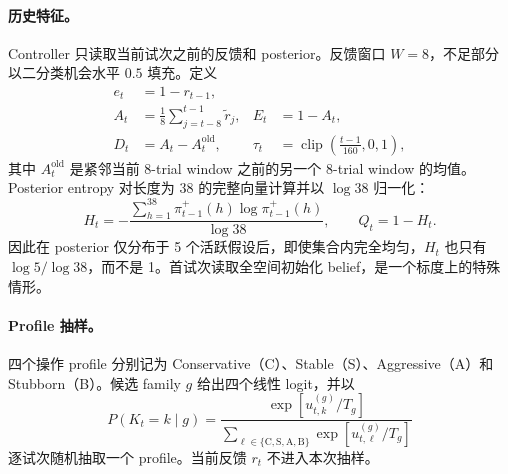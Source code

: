 \paragraph{历史特征。}
Controller 只读取当前试次之前的反馈和 posterior。反馈窗口 $W=8$，不足部分以二分类机会水平 $0.5$ 填充。定义
\begin{align}
    e_t&=1-r_{t-1},\\
    A_t&=\frac{1}{8}\sum_{j=t-8}^{t-1}\widetilde r_j,
    &E_t&=1-A_t,\\
    D_t&=A_t-A_t^{\mathrm{old}},
    &\tau_t&=\operatorname{clip}\!\left(\frac{t-1}{160},0,1\right),
    \label{eq:modelv13-controller-history}
\end{align}
其中 $A_t^{\mathrm{old}}$ 是紧邻当前 8-trial window 之前的另一个 8-trial window 的均值。Posterior entropy 对长度为 38 的完整向量计算并以 $\log38$ 归一化：
\begin{equation}
    H_t=-\frac{\sum_{h=1}^{38}\pi_{t-1}^{+}(h)
    \log\pi_{t-1}^{+}(h)}{\log38},
    \qquad Q_t=1-H_t.
    \label{eq:modelv13-controller-entropy}
\end{equation}
因此在 posterior 仅分布于 5 个活跃假设后，即使集合内完全均匀，$H_t$ 也只有 $\log5/\log38$，而不是 1。首试次读取全空间初始化 belief，是一个标度上的特殊情形。

\paragraph{Profile 抽样。}
四个操作 profile 分别记为 Conservative（C）、Stable（S）、Aggressive（A）和 Stubborn（B）。候选 family $g$ 给出四个线性 logit，并以
\begin{equation}
    P(K_t=k\mid g)=
    \frac{\exp[u_{t,k}^{(g)}/T_g]}
    {\sum_{\ell\in\{\mathrm C,\mathrm S,\mathrm A,\mathrm B\}}
    \exp[u_{t,\ell}^{(g)}/T_g]}
    \label{eq:modelv13-profile-softmax}
\end{equation}
逐试次随机抽取一个 profile。当前反馈 $r_t$ 不进入本次抽样。

